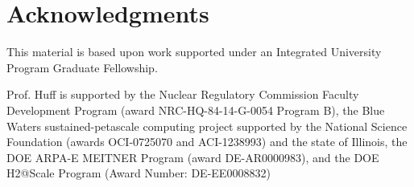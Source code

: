 \section{Acknowledgments}
This material is based upon work supported under an Integrated University Program Graduate
Fellowship.

Prof. Huff is supported by the Nuclear Regulatory Commission Faculty Development
Program (award NRC-HQ-84-14-G-0054 Program B), the Blue Waters 
sustained-petascale computing project supported by the National Science 
Foundation (awards OCI-0725070 and ACI-1238993) and the state of Illinois, 
the DOE ARPA-E MEITNER Program (award DE-AR0000983), and the DOE H2@Scale 
Program (Award Number: DE-EE0008832)
